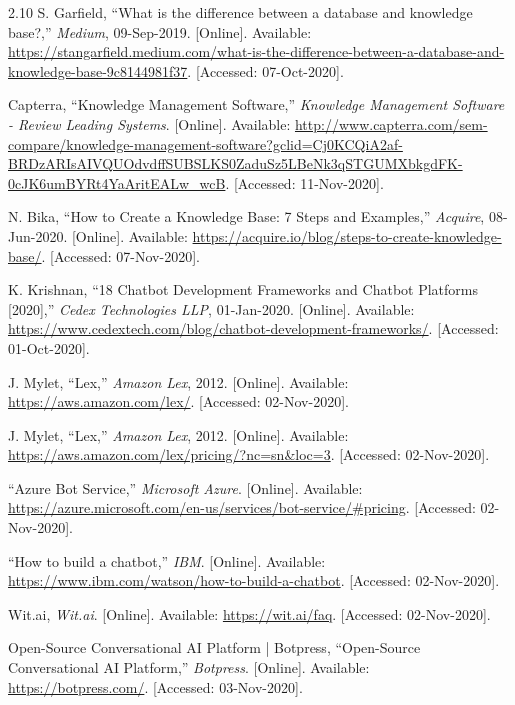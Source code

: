 \documentclass[titlepage, 12pt]{article}
\begin{document}
\begin{thebibliography}{9}
2.10 S. Garfield, “What is the difference between a database and knowledge base?,” \emph{Medium}, 09-Sep-2019. [Online]. Available: \url{https://stangarfield.medium.com/what-is-the-difference-between-a-database-and-knowledge-base-9c8144981f37}. [Accessed: 07-Oct-2020].

Capterra, “Knowledge Management Software,” \emph{Knowledge Management Software - Review Leading Systems}. [Online]. Available: \url{http://www.capterra.com/sem-compare/knowledge-management-software?gclid=Cj0KCQiA2af-BRDzARIsAIVQUOdvdffSUBSLKS0ZaduSz5LBeNk3qSTGUMXbkgdFK-0cJK6umBYRt4YaAritEALw\_wcB}. [Accessed: 11-Nov-2020].

N. Bika, “How to Create a Knowledge Base: 7 Steps and Examples,” \emph{Acquire}, 08-Jun-2020. [Online]. Available: \url{https://acquire.io/blog/steps-to-create-knowledge-base/}. [Accessed: 07-Nov-2020].

K. Krishnan, “18 Chatbot Development Frameworks and Chatbot Platforms [2020],” \emph{Cedex Technologies LLP}, 01-Jan-2020. [Online]. Available: \url{https://www.cedextech.com/blog/chatbot-development-frameworks/}. [Accessed: 01-Oct-2020].

J. Mylet, “Lex,” \emph{Amazon Lex}, 2012. [Online]. Available: \url{https://aws.amazon.com/lex/}. [Accessed: 02-Nov-2020].

J. Mylet, “Lex,” \emph{Amazon Lex}, 2012. [Online]. Available: \url{https://aws.amazon.com/lex/pricing/?nc=sn\&loc=3}. [Accessed: 02-Nov-2020].

“Azure Bot Service,” \emph{Microsoft Azure}. [Online]. Available: \url{https://azure.microsoft.com/en-us/services/bot-service/\#pricing}. [Accessed: 02-Nov-2020].
 
“How to build a chatbot,” \emph{IBM}. [Online]. Available: \url{https://www.ibm.com/watson/how-to-build-a-chatbot}. [Accessed: 02-Nov-2020].

Wit.ai, \emph{Wit.ai}. [Online]. Available: \url{https://wit.ai/faq}. [Accessed: 02-Nov-2020].
 
Open-Source Conversational AI Platform | Botpress, “Open-Source Conversational AI Platform,” \emph{Botpress}. [Online]. Available: \url{https://botpress.com/}. [Accessed: 03-Nov-2020].

\end{thebibliography}
\end{document}
